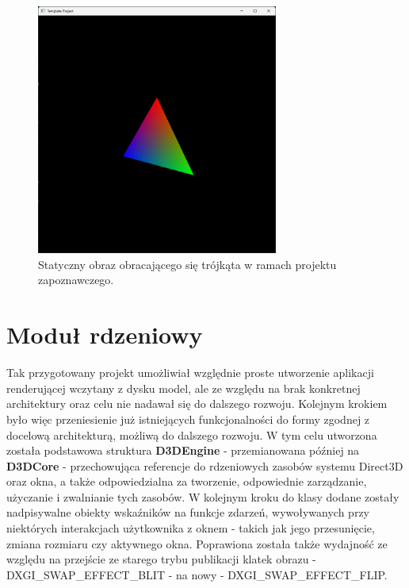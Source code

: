 \begin{figure}[h!]
	\centering
	\includegraphics[width=300px]{images/impl/1_template_project.png}
	\caption{Statyczny obraz obracającego się trójkąta w ramach projektu zapoznawczego.}
	\label{Impl_TemplateProject}
\end{figure}

\section{Moduł rdzeniowy}
Tak przygotowany projekt umożliwiał względnie proste utworzenie aplikacji renderującej wczytany z dysku model, ale ze względu na brak konkretnej architektury oraz celu nie nadawał się do dalszego rozwoju. Kolejnym krokiem było więc przeniesienie już istniejących funkcjonalności do formy zgodnej z docelową architekturą, możliwą do dalszego rozwoju. W tym celu utworzona została podstawowa struktura \textbf{D3DEngine} - przemianowana później na \textbf{D3DCore} - przechowująca referencje do rdzeniowych zasobów systemu Direct3D oraz okna, a także odpowiedzialna za tworzenie, odpowiednie zarządzanie, użyczanie i zwalnianie tych zasobów. W kolejnym kroku do klasy dodane zostały nadpisywalne obiekty wskaźników na funkcje zdarzeń, wywoływanych przy niektórych interakcjach użytkownika z oknem - takich jak jego przesunięcie, zmiana rozmiaru czy aktywnego okna. Poprawiona została także wydajność ze względu na przejście ze starego trybu publikacji klatek obrazu - DXGI\_SWAP\_EFFECT\_BLIT - na nowy - DXGI\_SWAP\_EFFECT\_FLIP. 

